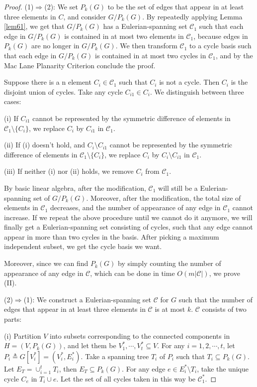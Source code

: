 \documentclass[10pt,fleqn]{article}
\newcommand{\rs}{\setminus}
\newcommand{\mc}[1]{\mathcal{#1}}
\newcommand{\imp}{\Rightarrow}
\begin{document}
	\begin{proof}
		(1)$\imp$(2): We set $P_k(G)$ to be the set of edges that appear in at least three elements in $C$, and consider $G/ P_k(G)$. By repeatedly applying Lemma \ref{lem61}, we get that $G/ P_k(G)$ has a Eulerian-spanning set $\mc{C}_1$ such that each edge in $G/ P_k(G)$ is contained in at most two elements in $\mc{C}_1$, because edges in $P_k(G)$ are no longer in $G/ P_k(G)$. We then transform $\mc{C}_1$ to a cycle basis such that each edge in $G/ P_k(G)$ is contained in at most two cycles in $\mc{C}_1$, and by the Mac Lane Planarity Criterion conclude the proof. \par
		Suppose there is a n element $C_i\in \mc{C}_1$ such that $C_i$ is not a cycle. Then $C_i$ is the disjoint union of cycles. Take any cycle $C_{i1}\in C_i$. We distinguish between three cases: \par
		(i) If $C_{i1}$ cannot be represented by the symmetric difference of elements in $\mc{C}_1\rs\{C_i\}$, we replace $C_i$ by $C_{i1}$ in $\mc{C}_1$. \par
		(ii) If (i) doesn't hold, and $C_i\rs C_{i1}$ cannot be represented by the symmetric difference of elements in $\mc{C}_1\rs\{C_i\}$, we replace $C_i$ by $C_i\rs C_{i1}$ in $\mc{C}_1$. \par
		(iii) If neither (i) nor (ii) holds, we remove $C_i$ from $\mc{C}_1$. \par
		By basic linear algebra, after the modification, $\mc{C}_1$ will still be a Eulerian-spanning set of $G/ P_k(G)$. Moreover, after the modification, the total size of elements in $\mc{C}_1$ decreases, and the number of appearance of any edge in $\mc{C}_1$ cannot increase. If we repeat the above procedure until we cannot do it anymore, we will finally get a Eulerian-spanning set consisting of cycles, such that any edge cannot appear in more than two cycles in the basis. After picking a maximum independent subset, we get the cycle basis we want. \par
		Moreover, since we can find $P_k(G)$ by simply counting the number of appearance of any edge in $\mc{C}$, which can be done in time $O(m|\mc{C}|)$, we prove (II). \par
		(2)$\imp$(1): We construct a Eulerian-spanning set $\mc{C}$ for $G$ such that the number of edges that appear in at least three elements in $\mc{C}$ is at most $k$. $\mc{C}$ consists of two parts: \par
		(i) Partition $V$ into subsets corresponding to the connected components in $H=(V,P_k(G))$, and let them be $V_1^*,\cdots,V_t^*\subseteq V$. For any $i=1,2,\cdots,t$, let $P_i\triangleq G[V_i^*]=(V_i^*,E_i^*)$. Take a spanning tree $T_i$ of $P_i$ such that $T_i\subseteq P_k(G)$. Let $E_T=\cup_{i=1}^tT_i$, then $E_T\subseteq P_k(G)$. For any edge $e\in E_i^*\rs T_i$, take the unique cycle $C_e$ in $T_i\cup e$. Let the set of all cycles taken in this way be $\mc{C}_1^*$. \par

\end{proof}
\end{document}
